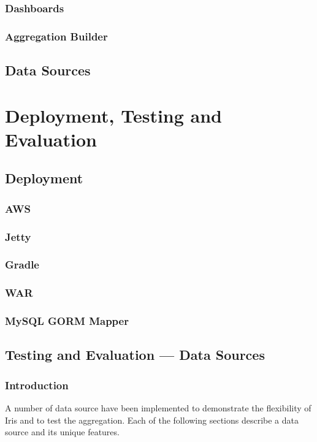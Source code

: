 \documentclass[12pt,a4paper,titlepage]{report}
\begin{document}
\subsection{Dashboards}
\subsection{Aggregation Builder}
\section{Data Sources}

\chapter{Deployment, Testing and Evaluation}

\section{Deployment}
\subsection{AWS}
\subsection{Jetty}
\subsection{Gradle}
\subsection{WAR}
\subsection{MySQL GORM Mapper}

\section{Testing and Evaluation --- Data Sources}
\subsection{Introduction}
A number of data source have been implemented to demonstrate the flexibility of Iris and to test the aggregation. Each
of the following sections describe a data source and its unique features.
\end{document}
